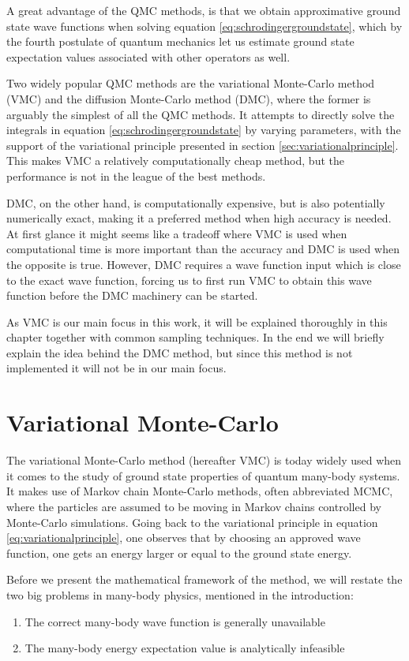 A great advantage of the QMC methods, is that we obtain approximative ground state wave functions when solving equation \eqref{eq:schrodingergroundstate}, which by the fourth postulate of quantum mechanics let us estimate ground state expectation values associated with other operators as well. 

Two widely popular QMC methods are the variational Monte-Carlo method (VMC) and the diffusion Monte-Carlo method (DMC), where the former is arguably the simplest of all the QMC methods. It attempts to directly solve the integrals in equation \eqref{eq:schrodingergroundstate} by varying parameters, with the support of the variational principle presented in section \ref{sec:variationalprinciple}. This makes VMC a relatively computationally cheap method, but the performance is not in the league of the best methods.

DMC, on the other hand, is computationally expensive, but is also potentially numerically exact, making it a preferred method when high accuracy is needed. At first glance it might seems like a tradeoff where VMC is used when computational time is more important than the accuracy and DMC is used when the opposite is true. However, DMC requires a wave function input which is close to the exact wave function, forcing us to first run VMC to obtain this wave function before the DMC machinery can be started.

As VMC is our main focus in this work, it will be explained thoroughly in this chapter together with common sampling techniques. In the end we will briefly explain the idea behind the DMC method, but since this method is not implemented it will not be in our main focus.

\section{Variational Monte-Carlo} \label{subsec:vmc}
The variational Monte-Carlo method (hereafter VMC) is today widely used when it comes to the study of ground state properties of quantum many-body systems. It makes use of Markov chain Monte-Carlo methods, often abbreviated MCMC, where the particles are assumed to be moving in Markov chains controlled by Monte-Carlo simulations. Going back to the variational principle in equation \eqref{eq:variationalprinciple}, one observes that by choosing an approved wave function, one gets an energy larger or equal to the ground state energy. \bigskip

Before we present the mathematical framework of the method, we will restate the two big problems in many-body physics, mentioned in the introduction:
\begin{enumerate}
	\item The correct many-body wave function is generally unavailable
	\item The many-body energy expectation value is analytically infeasible
\end{enumerate}

